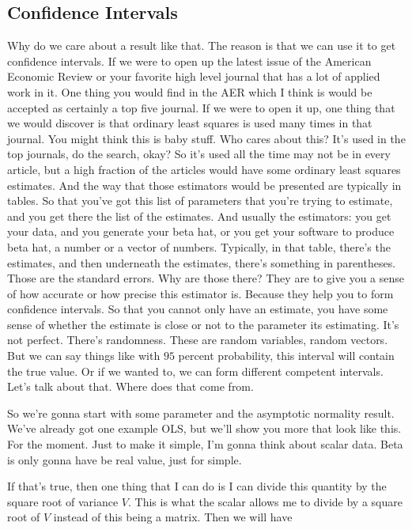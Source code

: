 \documentclass[11pt,a4paper]{amsart}
\theoremstyle{plain}
\theoremstyle{definition}
\begin{document}
\subsection{Confidence Intervals}
	Why do we care about a result like that. The reason is that we can use it to get confidence intervals. If we were to open up the latest issue of the American Economic Review or your favorite high level journal that has a lot of applied work in it. One thing you would find in the AER which I think is would be accepted as certainly a top five journal. If we were to open it up, one thing that we would discover is that ordinary least squares is used many times in that journal. You might think this is baby stuff. Who cares about this? It's used in the top journals, do the search, okay? So it's used all the time may not be in every article, but a high fraction of the articles would have some ordinary least squares estimates. And the way that those estimators would be presented are typically in tables. So that you've got this list of parameters that you're trying to estimate, and you get there the list of the estimates. And usually the estimators: you get your data, and you generate your beta hat, or you get your software to produce beta hat, a number or a vector of numbers. Typically, in that table, there's the estimates, and then underneath the estimates, there's something in parentheses. Those are the standard errors. Why are those there? They are to give you a sense of how accurate or how precise this estimator is. Because they help you to form confidence intervals. So that you cannot only have an estimate, you have some sense of whether the estimate is close or not to the parameter its estimating. It's not perfect. There's randomness. These are random variables, random vectors. But we can say things like with $95$ percent probability, this interval will contain the true value. Or if we wanted to, we can form different competent intervals. Let's talk about that. Where does that come from.\par 
	So we're gonna start with some parameter and the asymptotic normality result. We've already got one example OLS, but we'll show you more that look like this. For the moment. Just to make it simple, I'm gonna think about scalar data. Beta is only gonna have be real value, just for simple.\par 
	If that's true, then one thing that I can do is I can divide this quantity by the square root of variance $V$. This is what the scalar allows me to divide by a square root of $V$ instead of this being a matrix. Then we will have 
\end{document}
